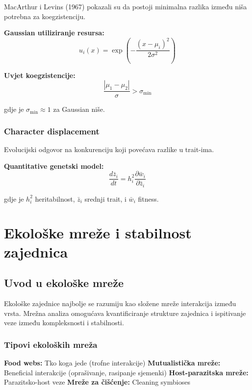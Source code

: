 \documentclass[11pt,oneside]{book}
\begin{document}
MacArthur i Levins (1967) pokazali su da postoji minimalna razlika između niša potrebna za koegzistenciju.

\textbf{Gaussian utiliziranje resursa:}
\begin{equation}
	u_i(x) = \exp\left(-\frac{(x - \mu_i)^2}{2\sigma^2}\right)
\end{equation}

\textbf{Uvjet koegzistencije:}
\begin{equation}
	\frac{|\mu_1 - \mu_2|}{\sigma} > \sigma_{\text{min}}
\end{equation}

gdje je $\sigma_{\text{min}} \approx 1$ za Gaussian niše.

\subsubsection{Character displacement}

Evolucijski odgovor na konkurenciju koji povećava razlike u trait-ima.

\textbf{Quantitative genetski model:}
\begin{equation}
	\frac{d\bar{z}_i}{dt} = h_i^2 \frac{\partial \bar{w}_i}{\partial \bar{z}_i}
\end{equation}

gdje je $h_i^2$ heritabilnost, $\bar{z}_i$ srednji trait, i $\bar{w}_i$ fitness.

\section{Ekološke mreže i stabilnost zajednica}

\subsection{Uvod u ekološke mreže}

Ekološke zajednice najbolje se razumiju kao složene mreže interakcija između vrsta. Mrežna analiza omogućava kvantificiranje strukture zajednica i ispitivanje veze između kompleksnosti i stabilnosti.

\subsubsection{Tipovi ekoloških mreža}

\textbf{Food webs:} Tko koga jede (trofne interakcije)
\textbf{Mutualistička mreže:} Beneficial interakcije (oprašivanje, rasipanje sjemenki)
\textbf{Host-parazitska mreže:} Parazitsko-host veze
\textbf{Mreže za čišćenje:} Cleaning symbioses
\end{document}
